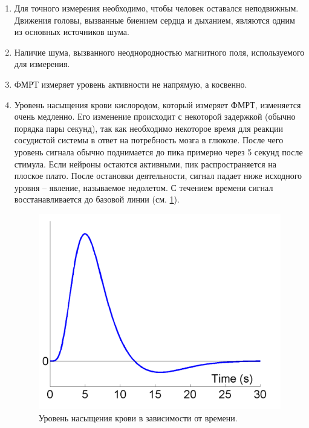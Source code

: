 \documentclass[pdftex,ptm,12pt,a4paper]{report}
\theoremstyle{definition}
\begin{document}
\begin{enumerate}
\item Для точного измерения необходимо, чтобы человек оставался неподвижным. Движения головы, вызванные биением сердца и дыханием, являются одним из основных источников шума.

\item Наличие шума, вызванного неоднородностью магнитного поля, используемого для измерения.

\item ФМРТ измеряет уровень активности не напрямую, а косвенно.

\item Уровень насыщения крови кислородом, который измеряет ФМРТ, изменяется очень медленно. Его изменение происходит с некоторой задержкой (обычно порядка пары секунд), так как необходимо некоторое время для реакции сосудистой системы в ответ на потребность мозга в глюкозе. После чего уровень сигнала обычно поднимается до пика примерно через 5 секунд после стимула. Если нейроны остаются активными, пик распространяется на плоское плато. После остановки деятельности, сигнал падает ниже исходного уровня -- явление, называемое недолетом. С течением времени сигнал восстанавливается до базовой линии (см. \ref{hrf}). 

\begin{figure}[h]
\includegraphics[scale=0.45]{images/hrf.png}
\centering
\caption{Уровень насыщения крови в зависимости от времени.}
\label{hrf}
\end{figure}

\end{enumerate}
\end{document}
